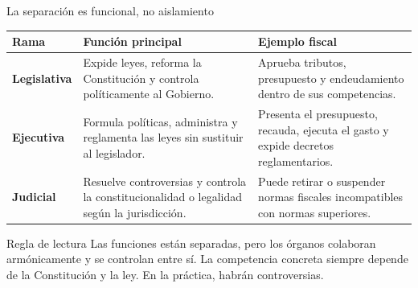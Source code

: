 \begin{frame}{La separaci\'on es funcional, no aislamiento}
\small
\begin{tabular}{p{}p{}p{}}
\textbf{Rama} & \textbf{Funci\'on principal} & \textbf{Ejemplo fiscal} \\ \hline
\textbf{Legislativa} &
Expide leyes, reforma la Constituci\'on y controla pol\'iticamente al Gobierno. &
Aprueba tributos, presupuesto y endeudamiento dentro de sus competencias. \\[0.18cm]
\textbf{Ejecutiva} &
Formula pol\'iticas, administra y reglamenta las leyes sin sustituir al legislador. &
Presenta el presupuesto, recauda, ejecuta el gasto y expide decretos reglamentarios. \\[0.18cm]
\textbf{Judicial} &
Resuelve controversias y controla la constitucionalidad o legalidad seg\'un la jurisdicci\'on. &
Puede retirar o suspender normas fiscales incompatibles con normas superiores. \\
\end{tabular}
\vspace{0.25cm}
\begin{block}{Regla de lectura}
Las funciones est\'an separadas, pero los \'organos colaboran arm\'onicamente y se controlan entre s\'i. La competencia concreta siempre depende de la Constituci\'on y la ley. En la práctica, habrán controversias.
\end{block}
\end{frame}

